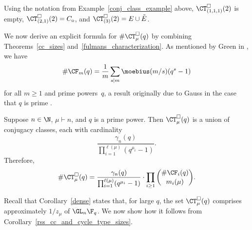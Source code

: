 \begin{example}
Using the notation from Example~\ref{conj_class_example} above,
\(\CT^\Box_{(1,1,1)} (2) \) is empty,
\(\CT^\Box_{(2,1)} (2) = C_{\mathrm{o}}\), and
\(\CT^\Box_{(3)} (2) = E \cup \tilde{E}\).
\end{example}

We now derive an explicit formula for \(\# \CT_\mu^\Box (q)\) by combining Theorems~\ref{cc_sizes} and~\ref{fulmans_characterization}.
As mentioned by Green in \cite{green}, we have
\begin{equation}
\label{size_of_Fm}
\# \CF_m (q) = \frac{1}{m} \sum_{s \mid m} \moebius(m/s)(q^s-1)
\end{equation}
for all \(m \geq 1\) and prime powers~\(q\),
a result originally due to Gauss in the case that \(q\) is prime \cite{gauss}.

\begin{corollary}
\label{rss_cc_and_cycle_type_sizes}
Suppose \(n \in \N\), \(\mu \vdash n\), and \(q\) is a prime power.
Then \(\CT_\mu^\Box (q)\) is a union of conjugacy classes, each with cardinality
\[
\frac{\gamma_n(q)}{\prod_{i=1}^{\ell(\mu)} (q^{\mu_i}-1)}.
\]
Therefore,
\[
\# \CT_\mu^\Box (q)
=
\frac{\gamma_n(q)}{\prod_{i=1}^{\ell(\mu)} (q^{\mu_i}-1)}
\cdot
\prod_{i \geq 1}
\binom{\# \CF_i (q)}{m_i(\mu)}.
\]
\end{corollary}

Recall that Corollary~\ref{dense} states that, for large \(q\), the set \(\CT^\Box_\mu (q)\) comprises approximately \(1 / z_\mu\) of \(\GL_n \F_q\).
We now show how it follows from Corollary~\ref{rss_cc_and_cycle_type_sizes}.

